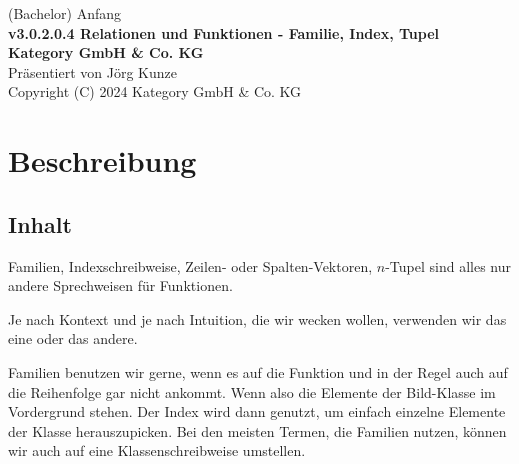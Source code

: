 \documentclass[a4paper]{amsart}
\theoremstyle{definition}
\begin{document}
\begin{titlepage}
\centering
{\huge
(Bachelor) Anfang\\[1cm]
\textbf{v3.0.2.0.4 Relationen und Funktionen - Familie, Index, Tupel}
}\\[1cm]

\textbf{Kategory GmbH \& Co. KG}\\
Präsentiert von Jörg Kunze\\
Copyright (C) 2024 Kategory GmbH \& Co. KG

\end{titlepage}

%

\newpage

\section*{Beschreibung}

\subsection*{Inhalt}
Familien, Indexschreibweise, Zeilen- oder Spalten-Vektoren, $n$-Tupel sind alles nur andere Sprechweisen für Funktionen.

Je nach Kontext und je nach Intuition, die wir wecken wollen, verwenden wir das eine oder das andere.

Familien benutzen wir gerne, wenn es auf die Funktion und in der Regel auch auf die Reihenfolge gar nicht ankommt. Wenn also die Elemente der Bild-Klasse im Vordergrund stehen. Der Index wird dann genutzt, um einfach einzelne Elemente der Klasse herauszupicken. Bei den meisten Termen, die Familien nutzen, können wir auch auf eine Klassenschreibweise umstellen.
\end{document}
